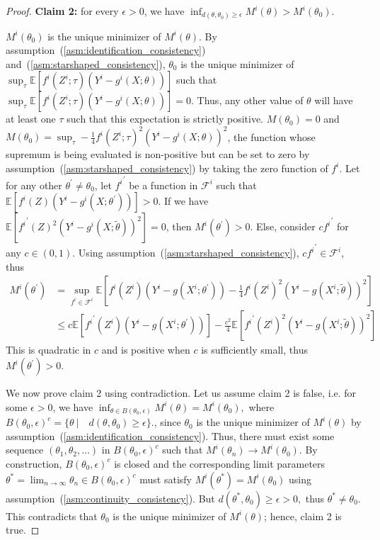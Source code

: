 \documentclass{article}
\def\gF{{\mathcal{F}}}
\theoremstyle{definition}
\begin{document}
\begin{proof}
\noindent\textbf{Claim 2:} for every $\epsilon>0$, we have $\inf_{d(\theta,\theta_0)\geq \epsilon}M^i(\theta)>M^i(\theta_0)$.

$M^i(\theta_0)$ is the unique minimizer of $M^i(\theta)$. By assumption~(\ref{asm:identification_consistency}) and~(\ref{asm:starshaped_consistency}), $\theta_0$ is the unique minimizer of $\sup_{\tau}\mathbb{E}[f^i(Z^i;\tau)(Y^i-g^i(X;\theta))]$ such that $\sup_{\tau}\mathbb{E}[f^i(Z^i;\tau)(Y^i-g^i(X;\theta))]=0$. Thus, any other value of $\theta$ will have at least one $\tau$ such that this expectation is strictly positive. $M(\theta_0)=0$ and $M(\theta_0)=\sup_{\tau}-\frac{1}{4}f^i(Z^i;\tau)^2(Y^i-g^i(X;\theta))^2$, the function whose supremum is being evaluated is non-positive but can be set to zero by assumption~(\ref{asm:starshaped_consistency}) by taking the zero function of $f^i$. Let for any other $\theta^{\prime}\neq\theta_0$, let ${f^i}^{\prime}$ be a function in $\gF^i$ such that $\mathbb{E}[f^i(Z)(Y^i-g^i(X;\theta^{\prime}))]>0$. If we have $\mathbb{E}[{f^i}^{\prime}(Z)^2(Y^i-g^i(X;\tilde\theta))^2]=0$, then $M^i(\theta^\prime)>0$. Else, consider $c{f^i}^{\prime}$ for any $c\in(0,1)$. Using assumption~(\ref{asm:starshaped_consistency}), $c{f^i}^{\prime}\in\gF^i$, thus
\begin{eqnarray*}
    M^i(\theta^\prime)&=\sup_{f^i\in\gF^i}\mathbb{E}\left[f^i(Z^i)(Y^i-g(X^i;\theta^{\prime}))-\frac{1}{4}f^i(Z^i)^2(Y^i-g(X^i;\tilde{\theta}))^2\right]\\
    &\leq c\mathbb{E}\left[{f^i}^{\prime}(Z^i)(Y^i-g(X^i;\theta^{\prime}))\right]-\frac{c^2}{4}\mathbb{E}\left[{f^i}^{\prime}(Z^i)^2(Y^i-g(X^i;\tilde{\theta}))^2\right]
\end{eqnarray*}
This is quadratic in $c$ and is positive when $c$ is sufficiently small, thus $M^i(\theta^\prime)>0$.

We now prove claim 2 using contradiction. Let us assume claim 2 is false, i.e. for some $\epsilon>0$, we have $\inf_{\theta\in \textit{B}(\theta_0,\epsilon)}M^i(\theta)=M^i(\theta_0),$ where $\textit{B}(\theta_0,\epsilon)^c=\{\theta~|\quad d(\theta,\theta_0)\geq \epsilon\}$., since $\theta_0$ is the unique minimizer of $M^i(\theta)$ by assumption~(\ref{asm:identification_consistency}). Thus, there must exist some sequence $(\theta_1,\theta_2,\dots)$ in $\textit{B}(\theta_0,\epsilon)^c$ such that $M^i(\theta_n)\rightarrow M^i(\theta_0)$. By construction, $\textit{B}(\theta_0,\epsilon)^c$ is closed and the corresponding limit parameters $\theta^*=\lim_{n\rightarrow\infty}\theta_n\in\textit{B}(\theta_0,\epsilon)^c$ must satisfy $M^i(\theta^*)=M^i(\theta_0)$ using assumption~(\ref{asm:continuity_consistency}). But $d(\theta^*,\theta_0)\geq \epsilon>0,$ thus $\theta^*\neq\theta_0$. This contradicts that $\theta_0$ is the unique minimizer of $M^i(\theta)$; hence, claim 2 is true.



\end{proof}
\end{document}
